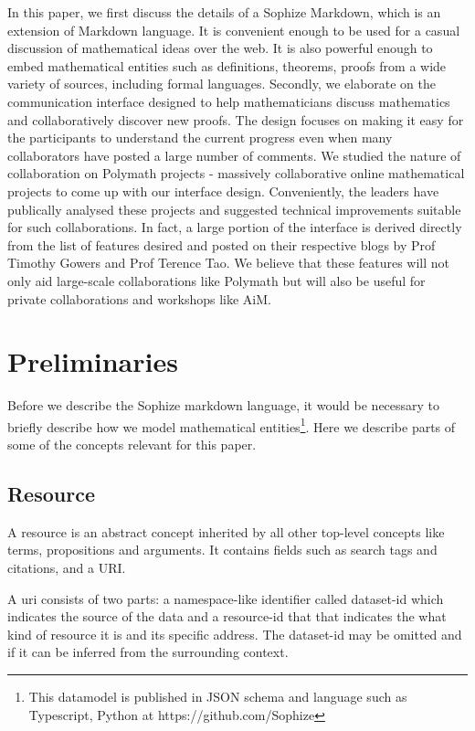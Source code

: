 \documentclass[a4paper]{article}
\begin{document}
In this paper, we first discuss the details of a Sophize Markdown, which is an extension of Markdown language. It is convenient enough to be used for a casual discussion of mathematical ideas over the web. It is also powerful enough to embed mathematical entities such as definitions, theorems, proofs from a wide variety of sources, including formal languages. Secondly, we elaborate on the communication interface designed to help mathematicians discuss mathematics and collaboratively discover new proofs. The design focuses on making it easy for the participants to understand the current progress even when many collaborators have posted a large number of comments. We studied the nature of collaboration on Polymath projects - massively collaborative online mathematical projects to come up with our interface design. Conveniently, the leaders have publically analysed these projects and suggested technical improvements suitable for such collaborations. In fact, a large portion of the interface is derived directly from the list of features desired and posted on their respective blogs by Prof Timothy Gowers and Prof Terence Tao. We believe that these features will not only aid large-scale collaborations like Polymath but will also be useful for private collaborations and workshops like AiM.


\section{Preliminaries}

Before we describe the Sophize markdown language, it would be necessary to briefly describe how we model mathematical entities\footnote{This datamodel is published in JSON schema and language such as Typescript, Python at https://github.com/Sophize}. Here we describe parts of some of the concepts relevant for this paper.

\subsection*{Resource}
A resource is an abstract concept inherited by all other top-level concepts like terms, propositions and arguments. It contains fields such as search tags and citations, and a URI.

A uri consists of two parts: a namespace-like identifier called dataset-id which indicates the source of the data and a resource-id that that indicates the what kind of resource it is and its specific address. The dataset-id may be omitted and if it can be inferred from the surrounding context.
\end{document}

